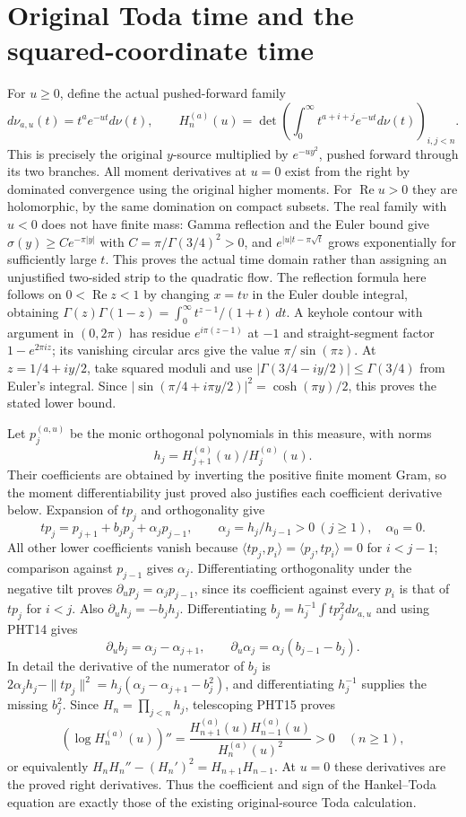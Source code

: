 \section{Original Toda time and the squared-coordinate time}

For $u\geq0$, define the actual pushed-forward family
\[
 d\nu_{a,u}(t)=t^a e^{-ut}d\nu(t),\qquad
 H_n^{(a)}(u)=\det\left(\int_0^\infty
                    t^{a+i+j}e^{-ut}d\nu(t)\right)_{i,j<n}.
\tag{PHT13}
\]
This is precisely the original $y$-source multiplied by
$e^{-u y^2}$, pushed forward through its two branches.
All moment derivatives at $u=0$ exist from the right by
dominated convergence using the original higher moments.
For $\operatorname{Re}u>0$ they are holomorphic, by the same
domination on compact subsets. The real family with $u<0$
does not have finite mass: Gamma reflection and the Euler
bound give $\sigma(y)\geq C e^{-\pi|y|}$ with
$C=\pi/\Gamma(3/4)^2>0$, and
$e^{|u|t-\pi\sqrt t}$ grows exponentially for sufficiently
large $t$. This proves the actual time domain rather than
assigning an unjustified two-sided strip to the quadratic flow.
The reflection formula here follows on $0<\operatorname{Re}z<1$
by changing $x=tv$ in the Euler double integral, obtaining
$\Gamma(z)\Gamma(1-z)=\int_0^\infty t^{z-1}/(1+t)\,dt$.
A keyhole contour with argument in $(0,2\pi)$ has residue
$e^{i\pi(z-1)}$ at $-1$ and straight-segment factor
$1-e^{2\pi iz}$; its vanishing circular arcs give the value
$\pi/\sin(\pi z)$. At $z=1/4+iy/2$, take squared moduli
and use $|\Gamma(3/4-iy/2)|\leq\Gamma(3/4)$ from Euler's
integral. Since $|\sin(\pi/4+i\pi y/2)|^2
=\cosh(\pi y)/2$, this proves the stated lower bound.

Let $p_j^{(a,u)}$ be the monic orthogonal polynomials in this
measure, with norms
\[h_j=H_{j+1}^{(a)}(u)/H_j^{(a)}(u).\]
Their coefficients are obtained by inverting the positive
finite moment Gram, so the moment differentiability just
proved also justifies each coefficient derivative below.
Expansion of $tp_j$ and orthogonality give
\[
 tp_j=p_{j+1}+b_jp_j+\alpha_jp_{j-1},\qquad
 \alpha_j=h_j/h_{j-1}>0\ (j\geq1),\quad\alpha_0=0.
\tag{PHT14}
\]
All other lower coefficients vanish because
$\langle tp_j,p_i\rangle=\langle p_j,tp_i\rangle=0$
for $i<j-1$; comparison against $p_{j-1}$ gives $\alpha_j$.
Differentiating orthogonality under the negative tilt proves
$\partial_u p_j=\alpha_jp_{j-1}$, since its coefficient
against every $p_i$ is that of $tp_j$ for $i<j$.
Also $\partial_u h_j=-b_jh_j$. Differentiating
$b_j=h_j^{-1}\int t p_j^2d\nu_{a,u}$ and using PHT14 gives
\[
 \partial_u b_j=\alpha_j-\alpha_{j+1},\qquad
 \partial_u\alpha_j=\alpha_j(b_{j-1}-b_j).
\tag{PHT15}
\]
In detail the derivative of the numerator of $b_j$ is
$2\alpha_jh_j-\|tp_j\|^2
=h_j(\alpha_j-\alpha_{j+1}-b_j^2)$, and differentiating
$h_j^{-1}$ supplies the missing $b_j^2$.
Since $H_n=\prod_{j<n}h_j$, telescoping PHT15 proves
\[
 (\log H_n^{(a)}(u))''
  =\frac{H_{n+1}^{(a)}(u)H_{n-1}^{(a)}(u)}{H_n^{(a)}(u)^2}>0
  \quad(n\geq1),
\tag{PHT16}
\]
or equivalently
$H_nH_n''-(H_n')^2=H_{n+1}H_{n-1}$.
At $u=0$ these derivatives are the proved right derivatives.
Thus the coefficient and sign of the Hankel--Toda equation
are exactly those of the existing original-source Toda calculation.


